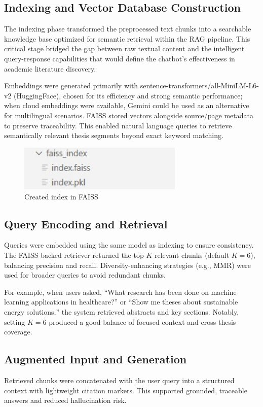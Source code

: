 \begin{refsection}
\subsection{Indexing and Vector Database Construction}
The indexing phase transformed the preprocessed text chunks into a searchable knowledge base optimized for semantic retrieval within the RAG pipeline. This critical stage bridged the gap between raw textual content and the intelligent query-response capabilities that would define the chatbot's effectiveness in academic literature discovery.

Embeddings were generated primarily with sentence-transformers/all-MiniLM-L6-v2 (HuggingFace), chosen for its efficiency and strong semantic performance; when cloud embeddings were available, Gemini could be used as an alternative for multilingual scenarios. FAISS stored vectors alongside source/page metadata to preserve traceability. This enabled natural language queries to retrieve semantically relevant thesis segments beyond exact keyword matching.

\begin{figure}[h]
    \centering
    \includegraphics[width=0.7\textwidth]{figures/index.jpg}
    \caption{Created index in FAISS}
\end{figure}

\subsection{Query Encoding and Retrieval}
Queries were embedded using the same model as indexing to ensure consistency. The FAISS-backed retriever returned the top-$K$ relevant chunks (default $K=6$), balancing precision and recall. Diversity-enhancing strategies (e.g., MMR) were used for broader queries to avoid redundant chunks.

For example, when users asked, “What research has been done on machine learning applications in healthcare?” or “Show me theses about sustainable energy solutions,” the system retrieved abstracts and key sections.  Notably, setting $K=6$ produced a good balance of focused context and cross-thesis coverage.

\subsection{Augmented Input and Generation}
Retrieved chunks were concatenated with the user query into a structured context with lightweight citation markers. This supported grounded, traceable answers and reduced hallucination risk.


\end{refsection}
